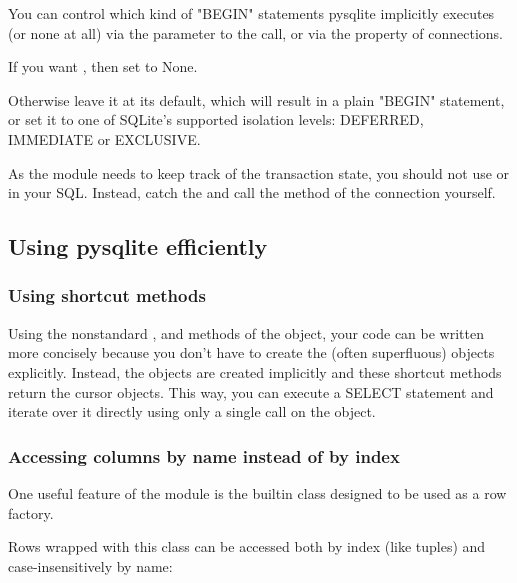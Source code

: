 You can control which kind of "BEGIN" statements pysqlite implicitly executes
(or none at all) via the  parameter to the
 call, or via the  property of
connections.

If you want , then set  to None.

Otherwise leave it at its default, which will result in a plain "BEGIN"
statement, or set it to one of SQLite's supported isolation levels: DEFERRED,
IMMEDIATE or EXCLUSIVE.

As the  module needs to keep track of the transaction state, you should
not use  or  in your SQL. Instead,
catch the  and call the  method of
the connection yourself.

\subsection{Using pysqlite efficiently}

\subsubsection{Using shortcut methods}

Using the nonstandard ,  and
 methods of the  object, your code can
be written more concisely because you don't have to create the (often
superfluous)  objects explicitly. Instead, the 
objects are created implicitly and these shortcut methods return the cursor
objects. This way, you can execute a SELECT statement and iterate
over it directly using only a single call on the  object.

    

\subsubsection{Accessing columns by name instead of by index}

One useful feature of the  module is the builtin  class
designed to be used as a row factory.

Rows wrapped with this class can be accessed both by index (like tuples) and
case-insensitively by name:

    



